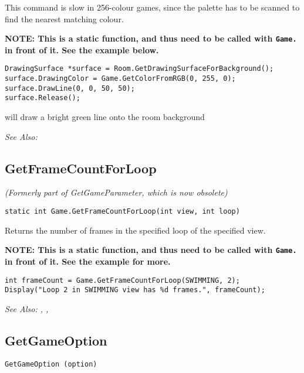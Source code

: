 This command is slow in 256-colour games, since the palette has to be scanned to find the
nearest matching colour.

\bf{NOTE:} This is a static function, and thus need to be called with \verb$Game.$ in front of it. See
the example below.

\begin{verbatim}
DrawingSurface *surface = Room.GetDrawingSurfaceForBackground();
surface.DrawingColor = Game.GetColorFromRGB(0, 255, 0);
surface.DrawLine(0, 0, 50, 50);
surface.Release();
\end{verbatim}
will draw a bright green line onto the room background

\it{See Also:} 


\subsection{GetFrameCountForLoop}\label{Game.GetFrameCountForLoop}%

\it{(Formerly part of GetGameParameter, which is now obsolete)}

\begin{verbatim}
static int Game.GetFrameCountForLoop(int view, int loop)
\end{verbatim}
Returns the number of frames in the specified loop of the specified view.

\bf{NOTE:} This is a static function, and thus need to be called with \verb$Game.$ in front of it. See
the example for more.

\begin{verbatim}
int frameCount = Game.GetFrameCountForLoop(SWIMMING, 2);
Display("Loop 2 in SWIMMING view has %d frames.", frameCount);
\end{verbatim}

\it{See Also:} ,
,


\subsection{GetGameOption}\label{GetGameOption}%

\begin{verbatim}
GetGameOption (option)
\end{verbatim}

